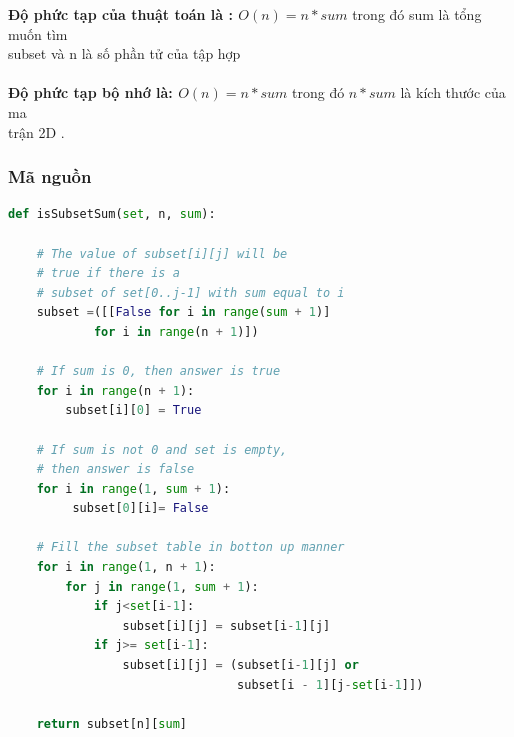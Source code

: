 \documentclass[a4paper]{article}
\newcommand\tab[1][1cm]{\hspace*{#1}}
\begin{document}
\tab \textbf{Độ phức tạp của thuật toán là : $O(n) = n*sum$} trong đó sum là tổng muốn tìm \\ \tab subset và n là số phần tử của tập hợp\\\\
\tab \textbf{Độ phức tạp bộ nhớ là: $O(n) = n*sum$ } trong đó $n*sum$ là kích thước của ma \\ \tab trận  2D
.\subsubsection{Mã nguồn}
\begin{center}
    \begin{lstlisting}[language=Python, caption=Solve Dynamic Programing]
def isSubsetSum(set, n, sum):
     
    # The value of subset[i][j] will be 
    # true if there is a
    # subset of set[0..j-1] with sum equal to i
    subset =([[False for i in range(sum + 1)] 
            for i in range(n + 1)])
     
    # If sum is 0, then answer is true 
    for i in range(n + 1):
        subset[i][0] = True
         
    # If sum is not 0 and set is empty, 
    # then answer is false 
    for i in range(1, sum + 1):
         subset[0][i]= False
             
    # Fill the subset table in botton up manner
    for i in range(1, n + 1):
        for j in range(1, sum + 1):
            if j<set[i-1]:
                subset[i][j] = subset[i-1][j]
            if j>= set[i-1]:
                subset[i][j] = (subset[i-1][j] or
                                subset[i - 1][j-set[i-1]])
     
    return subset[n][sum]
\end{lstlisting}
\end{center}
\end{document}

